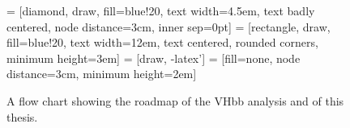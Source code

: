 \begin{figure}[h]
  \centering
   = [diamond, draw, fill=blue!20, 
  text width=4.5em, text badly centered, node distance=3cm, inner sep=0pt]
   = [rectangle, draw, fill=blue!20, text width=12em, text
  centered, rounded corners, minimum height=3em]
   = [draw, -latex']
   = [fill=none, node distance=3cm, minimum
  height=2em]
  
    
  \caption{A flow chart showing the roadmap of the VHbb analysis and of this thesis.}
  \label{fig:cxaod-flow}
\end{figure}
